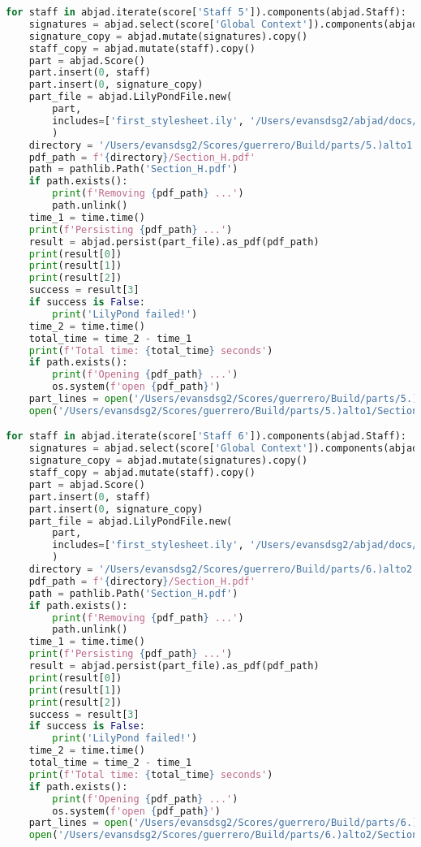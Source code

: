 \begin{lstlisting}[language=Python, caption=Invocation Source Code]
for staff in abjad.iterate(score['Staff 5']).components(abjad.Staff):
    signatures = abjad.select(score['Global Context']).components(abjad.Staff)
    signature_copy = abjad.mutate(signatures).copy()
    staff_copy = abjad.mutate(staff).copy()
    part = abjad.Score()
    part.insert(0, staff)
    part.insert(0, signature_copy)
    part_file = abjad.LilyPondFile.new(
        part,
        includes=['first_stylesheet.ily', '/Users/evansdsg2/abjad/docs/source/_stylesheets/abjad.ily'],
        )
    directory = '/Users/evansdsg2/Scores/guerrero/Build/parts/5.)alto1'
    pdf_path = f'{directory}/Section_H.pdf'
    path = pathlib.Path('Section_H.pdf')
    if path.exists():
        print(f'Removing {pdf_path} ...')
        path.unlink()
    time_1 = time.time()
    print(f'Persisting {pdf_path} ...')
    result = abjad.persist(part_file).as_pdf(pdf_path)
    print(result[0])
    print(result[1])
    print(result[2])
    success = result[3]
    if success is False:
        print('LilyPond failed!')
    time_2 = time.time()
    total_time = time_2 - time_1
    print(f'Total time: {total_time} seconds')
    if path.exists():
        print(f'Opening {pdf_path} ...')
        os.system(f'open {pdf_path}')
    part_lines = open('/Users/evansdsg2/Scores/guerrero/Build/parts/5.)alto1/Section_H.ly').readlines()
    open('/Users/evansdsg2/Scores/guerrero/Build/parts/5.)alto1/Section_H.ly', 'w').writelines(part_lines[15:-1])

for staff in abjad.iterate(score['Staff 6']).components(abjad.Staff):
    signatures = abjad.select(score['Global Context']).components(abjad.Staff)
    signature_copy = abjad.mutate(signatures).copy()
    staff_copy = abjad.mutate(staff).copy()
    part = abjad.Score()
    part.insert(0, staff)
    part.insert(0, signature_copy)
    part_file = abjad.LilyPondFile.new(
        part,
        includes=['first_stylesheet.ily', '/Users/evansdsg2/abjad/docs/source/_stylesheets/abjad.ily'],
        )
    directory = '/Users/evansdsg2/Scores/guerrero/Build/parts/6.)alto2'
    pdf_path = f'{directory}/Section_H.pdf'
    path = pathlib.Path('Section_H.pdf')
    if path.exists():
        print(f'Removing {pdf_path} ...')
        path.unlink()
    time_1 = time.time()
    print(f'Persisting {pdf_path} ...')
    result = abjad.persist(part_file).as_pdf(pdf_path)
    print(result[0])
    print(result[1])
    print(result[2])
    success = result[3]
    if success is False:
        print('LilyPond failed!')
    time_2 = time.time()
    total_time = time_2 - time_1
    print(f'Total time: {total_time} seconds')
    if path.exists():
        print(f'Opening {pdf_path} ...')
        os.system(f'open {pdf_path}')
    part_lines = open('/Users/evansdsg2/Scores/guerrero/Build/parts/6.)alto2/Section_H.ly').readlines()
    open('/Users/evansdsg2/Scores/guerrero/Build/parts/6.)alto2/Section_H.ly', 'w').writelines(part_lines[15:-1])


\end{lstlisting}
